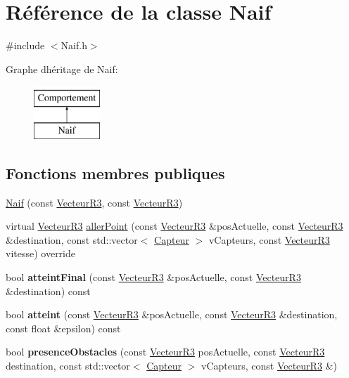 \hypertarget{class_naif}{}\section{Référence de la classe Naif}
\label{class_naif}


{\ttfamily \#include $<$Naif.\+h$>$}

Graphe d\textquotesingle{}héritage de Naif\+:\begin{figure}[H]
\begin{center}
\leavevmode
\includegraphics[height=2.000000cm]{class_naif}
\end{center}
\end{figure}
\subsection*{Fonctions membres publiques}
\begin{DoxyCompactItemize}
\item 
\mbox{\hyperlink{class_naif_acc816dcabca7caddbb282ec1bd232505}{Naif}} (const \mbox{\hyperlink{class_vecteur_r3}{Vecteur\+R3}}, const \mbox{\hyperlink{class_vecteur_r3}{Vecteur\+R3}})
\item 
virtual \mbox{\hyperlink{class_vecteur_r3}{Vecteur\+R3}} \mbox{\hyperlink{class_naif_a67a1d4cfa924c6f1f2d8c1a9421ae120}{aller\+Point}} (const \mbox{\hyperlink{class_vecteur_r3}{Vecteur\+R3}} \&pos\+Actuelle, const \mbox{\hyperlink{class_vecteur_r3}{Vecteur\+R3}} \&destination, const std\+::vector$<$ \mbox{\hyperlink{class_capteur}{Capteur}} $>$ v\+Capteurs, const \mbox{\hyperlink{class_vecteur_r3}{Vecteur\+R3}} vitesse) override
\item 
\mbox{\label{class_naif_a71d7556cd1c9bc323820e052d34d2e2d}} 
bool {\bfseries atteint\+Final} (const \mbox{\hyperlink{class_vecteur_r3}{Vecteur\+R3}} \&pos\+Actuelle, const \mbox{\hyperlink{class_vecteur_r3}{Vecteur\+R3}} \&destination) const
\item 
\mbox{\label{class_naif_aa5eaa77d98fe48768a8f6f031c287b8f}} 
bool {\bfseries atteint} (const \mbox{\hyperlink{class_vecteur_r3}{Vecteur\+R3}} \&pos\+Actuelle, const \mbox{\hyperlink{class_vecteur_r3}{Vecteur\+R3}} \&destination, const float \&epsilon) const
\item 
\mbox{\label{class_naif_a2bb16e2776f7e6cbb8cf75a4e78f6bc7}} 
bool {\bfseries presence\+Obstacles} (const \mbox{\hyperlink{class_vecteur_r3}{Vecteur\+R3}} pos\+Actuelle, const \mbox{\hyperlink{class_vecteur_r3}{Vecteur\+R3}} destination, const std\+::vector$<$ \mbox{\hyperlink{class_capteur}{Capteur}} $>$ v\+Capteurs, const \mbox{\hyperlink{class_vecteur_r3}{Vecteur\+R3}} \&)
\end{DoxyCompactItemize}
